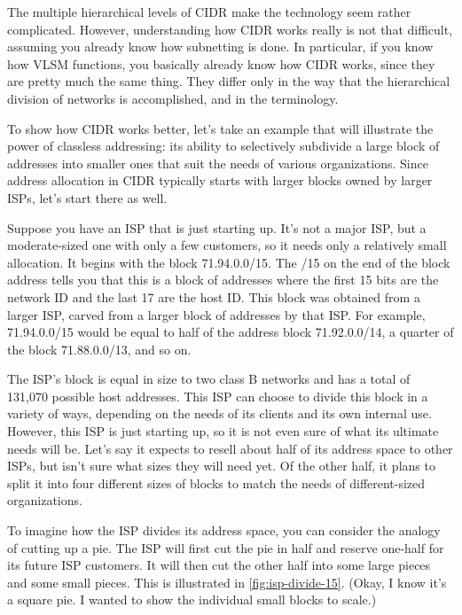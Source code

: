 
The multiple hierarchical levels of CIDR make the technology seem rather
complicated. However, understanding how CIDR works really is not that
difficult, assuming you already know how subnetting is done. In
particular, if you know how VLSM functions, you basically already know
how CIDR works, since they are pretty much the same thing. They differ
only in the way that the hierarchical division of networks is
accomplished, and in the terminology.

To show how CIDR works better, let's take an example that will
illustrate the power of classless
addressing:
its ability to selectively subdivide a large block of addresses into
smaller ones that suit the needs of various organizations. Since address
allocation in CIDR typically starts with larger blocks owned by larger
ISPs, let's start there as well.

Suppose you have an ISP that is just starting up. It's not a major ISP,
but a moderate-sized one with only a few customers, so it needs only a
relatively small allocation. It begins with the block 71.94.0.0/15. The
/15 on the end of the block address tells you that this is a block of
addresses where the first 15 bits are the network ID and the last 17 are
the host ID. This block was obtained from a larger ISP, carved from a
larger block of addresses by that ISP. For example, 71.94.0.0/15 would
be equal to half of the address block 71.92.0.0/14, a quarter of the
block 71.88.0.0/13, and so on.

The ISP's block is equal in size to two class B networks and has a total
of 131,070 possible host addresses. This ISP can choose to divide this
block in a variety of ways, depending on the needs of its clients and
its own internal use. However, this ISP is just starting up, so it is
not even sure of what its ultimate needs will be. Let's say it expects
to resell about half of its address space to other ISPs, but isn't sure
what sizes they will need yet. Of the other half, it plans to split it
into four different sizes of blocks to match the needs of different-sized organizations.

To imagine how the ISP divides its address space, you can consider the analogy of cutting up a pie.
The ISP will first cut the pie in half and reserve one-half for its future ISP customers.
It will then cut the other half into some large pieces and some small pieces.
This is illustrated in \cref{fig:isp-divide-15}.
(Okay, I know it's a square pie. I wanted to show the individual small blocks to scale.)


